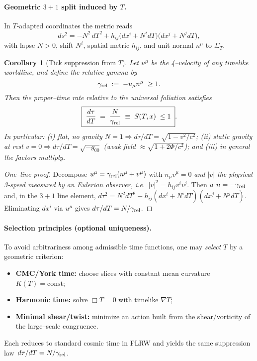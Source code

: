 \documentclass[12pt]{article}
\theoremstyle{plain}
\newtheorem{corollary}{Corollary}
\begin{document}
\paragraph{Geometric $3{+}1$ split induced by $T$.}
In $T$-adapted coordinates the metric reads
\[
ds^2=-N^2\,dT^2+h_{ij}\big(dx^i+N^i dT\big)\big(dx^j+N^j dT\big),
\]
with lapse $N>0$, shift $N^i$, spatial metric $h_{ij}$, and unit normal $n^\mu$ to $\Sigma_T$.

\begin{corollary}[Tick suppression from $T$]
\label{cor:suppression}
Let $u^\mu$ be the 4–velocity of any timelike worldline, and define the relative gamma by
\[
\gamma_{\rm rel}\;:=\;-u_\mu n^\mu\;\ge 1.
\]
Then the proper–time rate relative to the universal foliation satisfies
\[
\boxed{\;\frac{d\tau}{dT}\;=\;\frac{N}{\gamma_{\rm rel}}\;\equiv\;S(T,x)\;\le 1\;}.
\]
In particular: (i) flat, no gravity $N=1\Rightarrow d\tau/dT=\sqrt{1-v^2/c^2}$; (ii) static gravity at rest $v=0\Rightarrow d\tau/dT=\sqrt{-g_{00}}$ (weak field $\approx \sqrt{1+2\Phi/c^2}$); and (iii) in general the factors multiply.
\end{corollary}

\begin{proof}[One–line proof]
Decompose $u^\mu=\gamma_{\rm rel}(n^\mu+v^\mu)$ with $n_\mu v^\mu=0$ \emph{and $|v|$ the physical 3-speed measured by an Eulerian observer, i.e.\ $|v|^2=h_{ij}v^i v^j$}. Then $u\!\cdot\!n=-\gamma_{\rm rel}$ and, in the $3{+}1$ line element, $d\tau^2=N^2 dT^2 - h_{ij}(dx^i+N^i dT)(dx^j+N^j dT)$. Eliminating $dx^i$ via $u^\mu$ gives $d\tau/dT=N/\gamma_{\rm rel}$.
\end{proof}

\paragraph{Selection principles (optional uniqueness).}
To avoid arbitrariness among admissible time functions, one may \emph{select} $T$ by a geometric criterion:
\begin{itemize}
  \item \textbf{CMC/York time:} choose slices with constant mean curvature $K(T)=\text{const}$;
  \item \textbf{Harmonic time:} solve $\Box T=0$ with timelike $\nabla T$;
  \item \textbf{Minimal shear/twist:} minimize an action built from the shear/vorticity of the large–scale congruence.
\end{itemize}
Each reduces to standard cosmic time in FLRW and yields the same suppression law \(\,d\tau/dT=N/\gamma_{\rm rel}\).
\end{document}
